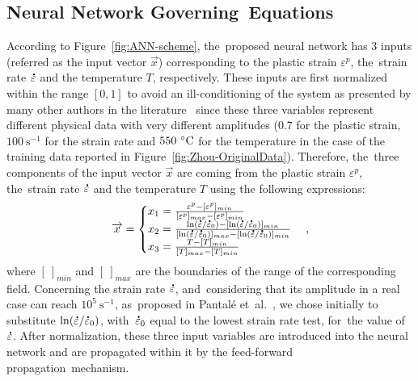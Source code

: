 \documentclass[algorithms,article,accept,pdftex,moreauthors]{Definitions/mdpi}
\DeclareRobustCommand{\mdot}[1]{\accentset{\mbox{\bfseries .}}{#1}}
\DeclareRobustCommand{\ps}{\text{s}^{-1}}
\begin{document}
\subsection{Neural Network Governing~Equations}\label{sec:ANN-equations}

According to Figure~\ref{fig:ANN-scheme}, the~proposed neural network has $3$ inputs (referred as the input vector $\overrightarrow{x}$) corresponding to the plastic strain $\varepsilon^p$, the~strain rate $\mdot\varepsilon$ and the temperature $T$, respectively.
These inputs are first normalized within the range $[0,1]$ to avoid an ill-conditioning of the system as presented by many other authors in the literature~\cite{Lin-2008, Lu-2011} since these three variables represent different physical data with very different amplitudes ($0.7$ for the plastic strain, $100~\ps$ for the strain rate and $550~\celsius$ for the temperature in the case of the training data reported in Figure~\ref{fig:Zhou-OriginalData}).
Therefore, the~three components of the input vector $\overrightarrow{x}$ are coming from the plastic strain $\varepsilon^p$, the~strain rate $\mdot\varepsilon$ and the temperature $T$ using the following expressions:
\begin{equation}
\overrightarrow{x}=
\begin{cases}
x_1 = \frac{\varepsilon^p - [\varepsilon^p]_{min}}{[\varepsilon^p]_{max} - [\varepsilon^p]_{min}}\\
x_2 = \frac{\ln(\mdot\varepsilon/\mdot\varepsilon_0)-[\ln(\mdot\varepsilon/\mdot\varepsilon_0)]_{min}}{[\ln(\mdot\varepsilon/\mdot\varepsilon_0)]_{max}-[\ln(\mdot\varepsilon/\mdot\varepsilon_0)]_{min}}\\
x_3 = \frac{T-[T]_{min}}{[T]_{max}-[T]_{min}}
\end{cases},
\label{eq:CR1}
\end{equation}
where $[~]_{min}$ and $[~]_{max}$  are the boundaries of the range of the corresponding field.
Concerning the strain rate $\mdot\varepsilon$, and~considering that its amplitude in a real case can reach $10^5~\ps$, as~proposed in Pantalé et~al.~\cite{Pantale-2021}, we chose initially to substitute $\ln(\mdot\varepsilon/\mdot\varepsilon_0)$, with~$\mdot\varepsilon_0$ equal to the lowest strain rate test, for~the value of $\mdot\varepsilon$.
After normalization, these three input variables are introduced into the neural network and are propagated within it by the feed-forward propagation~mechanism.
\end{document}
